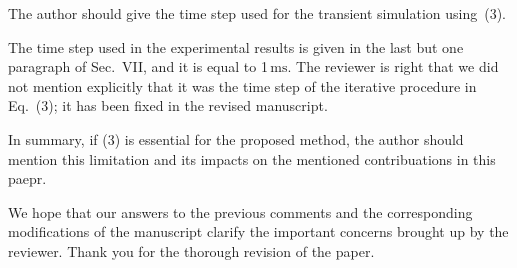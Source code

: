 \begin{reviewer}
The author should give the time step used for the transient simulation using~(3).
\end{reviewer}
\begin{authors}
The time step used in the experimental results is given in the last but one paragraph of Sec.~VII, and it is equal to 1$\,\text{ms}$.
The reviewer is right that we did not mention explicitly that it was the time step of the iterative procedure in Eq.~(3); it has been fixed in the revised manuscript.

\begin{actions}
\end{actions}
\end{authors}

\begin{reviewer}
In summary, if (3) is essential for the proposed method, the author should mention this limitation and its impacts on the mentioned contribuations in this paepr.
\end{reviewer}
\begin{authors}
We hope that our answers to the previous comments and the corresponding modifications of the manuscript clarify the important concerns brought up by the reviewer.
Thank you for the thorough revision of the paper.
\end{authors}
